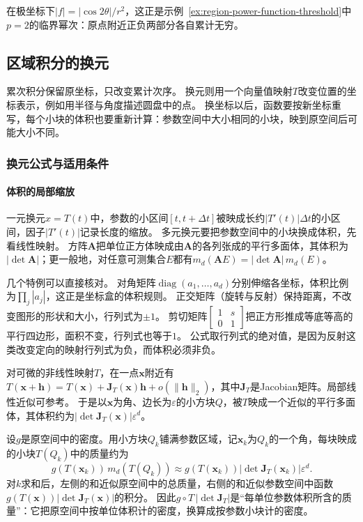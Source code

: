 在极坐标下$|f|=|\cos2\theta|/r^2$，这正是示例~\ref{ex:region-power-function-threshold}中$p=2$的临界幂次：原点附近正负两部分各自累计无穷。

\subsection{区域积分的换元}
\label{sec:multivariable-change-variables}

累次积分保留原坐标，只改变累计次序。
换元则用一个向量值映射$T$改变位置的坐标表示，例如用半径与角度描述圆盘中的点。
换坐标以后，函数要按新坐标重写，每个小块的体积也要重新计算：参数空间中大小相同的小块，映到原空间后可能大小不同。

\subsubsection{换元公式与适用条件}

\paragraph{体积的局部缩放}

一元换元$x=T(t)$中，参数的小区间$[t,t+\Delta t]$被映成长约$|T'(t)|\Delta t$的小区间，因子$|T'(t)|$记录长度的缩放。
多元换元要把参数空间中的小块换成体积，先看线性映射。
方阵$\bm A$把单位正方体映成由$\bm A$的各列张成的平行多面体，其体积为$|\det\bm A|$；更一般地，对任意可测集合$E$都有$m_d(\bm AE)=|\det\bm A|\,m_d(E)$。

几个特例可以直接核对。
对角矩阵$\operatorname{diag}(a_1,\ldots,a_d)$分别伸缩各坐标，体积比例为$\prod_j|a_j|$，这正是坐标盒的体积规则。
正交矩阵（旋转与反射）保持距离，不改变图形的形状和大小，行列式为$\pm1$。
剪切矩阵$\begin{bmatrix}1&s\\0&1\end{bmatrix}$把正方形推成等底等高的平行四边形，面积不变，行列式也等于$1$。
公式取行列式的绝对值，是因为反射这类改变定向的映射行列式为负，而体积必须非负。

对可微的非线性映射$T$，在一点$\bm x$附近有$T(\bm x+\bm h)=T(\bm x)+\bm J_T(\bm x)\bm h+o(\lVert\bm h\rVert_2)$，其中$\bm J_T$是Jacobian矩阵。局部线性近似可参考。
于是以$\bm x$为角、边长为$\varepsilon$的小方块$Q$，被$T$映成一个近似的平行多面体，其体积约为$|\det\bm J_T(\bm x)|\varepsilon^d$。

设$g$是原空间中的密度。用小方块$Q_k$铺满参数区域，记$\bm x_k$为$Q_k$的一个角，每块映成的小块$T(Q_k)$中的质量约为
\[
 g(T(\bm x_k))\,m_d(T(Q_k))\approx g(T(\bm x_k))|\det\bm J_T(\bm x_k)|\varepsilon^d.
\]
对$k$求和后，左侧的和近似原空间中的总质量，右侧的和近似参数空间中函数$g(T(\bm x))|\det\bm J_T(\bm x)|$的积分。
因此$g\circ T\,|\det\bm J_T|$是“每单位参数体积所含的质量”：它把原空间中按单位体积计的密度，换算成按参数小块计的密度。


